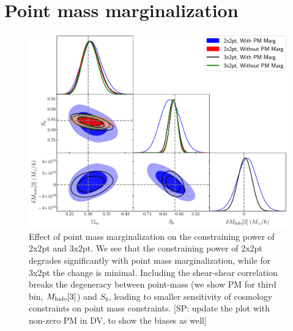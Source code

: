 \documentclass[fleqn,usenatbib]{mnras}
\newcommand{\SP}[1]{{\color{red}[SP: #1]}}
\begin{document}
\section{Point mass marginalization}


\begin{figure}
\includegraphics[width=\columnwidth]{figs/PM_constraints_2x2pt_3x2pt.pdf}
\caption[]{Effect of point mass marginalization on the constraining power of 2x2pt and 3x2pt. We see that the constraining power of 2x2pt degrades significantly with point mass marginalization, while for 3x2pt the change is minimal. Including the shear-shear correlation  breaks the degeneracy between point-mass (we show PM for third bin, $M_{\rm halo}[3]$) and $S_8$, leading to smaller sensitivity of cosmology constraints on point mass constraints. \SP{update the plot with non-zero PM in DV, to show the biases as well} }
\label{fig:pm_effect}
\end{figure}
\end{document}
